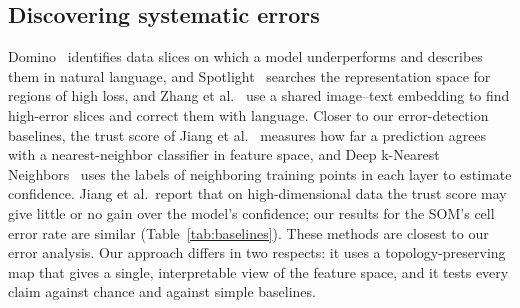 \documentclass[preprint,review,12pt]{elsarticle}
\begin{document}
\subsection{Discovering systematic errors}
Domino~\cite{eyuboglu2022domino} identifies data slices on which a model underperforms and describes them in natural language, and Spotlight~\cite{deon2022spotlight} searches the representation space for regions of high loss, and Zhang et al.~\cite{zhang2023diagnosing} use a shared image--text embedding to find high-error slices and correct them with language. Closer to our error-detection baselines, the trust score of Jiang et al.~\cite{jiang2018trust} measures how far a prediction agrees with a nearest-neighbor classifier in feature space, and Deep k-Nearest Neighbors~\cite{papernot2018dknn} uses the labels of neighboring training points in each layer to estimate confidence. Jiang et al.\ report that on high-dimensional data the trust score may give little or no gain over the model's confidence; our results for the SOM's cell error rate are similar (Table~\ref{tab:baselines}). These methods are closest to our error analysis. Our approach differs in two respects: it uses a topology-preserving map that gives a single, interpretable view of the feature space, and it tests every claim against chance and against simple baselines.
\end{document}
